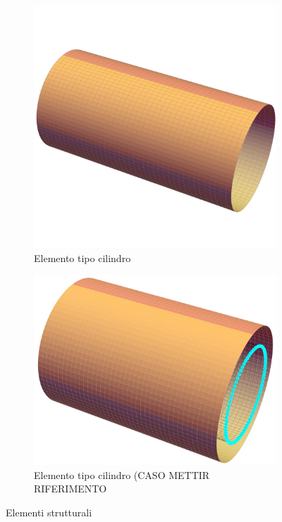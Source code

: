 \documentclass[a4paper,num-refs]{oup-contemporary}
\begin{document}
\begin{figure}[bt!]
	\hfill
	\begin{subfigure}[t]{0.24\textwidth}
		\centering
 \includegraphics[width=\textwidth]{cyl_.pdf}
\caption{Elemento tipo cilindro}
		\label{fig:three sin x}
	\end{subfigure}
	\hfill
	\begin{subfigure}[t]{0.24\textwidth}
	\centering
 \includegraphics[width=\textwidth]{cyl_deformed.pdf}
	\caption{Elemento tipo cilindro (CASO METTIR RIFERIMENTO}
	\label{fig:five ove x}
\end{subfigure}
	\hfill
	\caption{Elementi strutturali}
	\label{fig:three graphs}
\end{figure}
\end{document}
